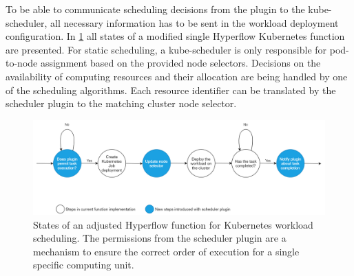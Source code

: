 To be able to communicate scheduling decisions from the plugin to the kube-scheduler, all necessary information has to be sent in the workload deployment configuration.
In \cref{fig:solution:k8s-states-single} all states of a modified single Hyperflow Kubernetes function are presented.
For static scheduling, a kube-scheduler is only responsible for pod-to-node assignment based on the provided node selectors.
Decisions on the availability of computing resources and their allocation are being handled by one of the scheduling algorithms.
Each resource identifier can be translated by the scheduler plugin to the matching cluster node selector.



\begin{figure}[H]
\centering
\includegraphics[width=1\linewidth]{figures/4-1-K8sFunction-2.png}
\caption[Adjusted Hyperflow function for Kubernetes workload scheduling]{States of an adjusted Hyperflow function for Kubernetes workload scheduling. The permissions from the scheduler plugin are a mechanism to ensure the correct order of execution for a single specific computing unit.}


\label{fig:solution:k8s-states-single}
\end{figure}


